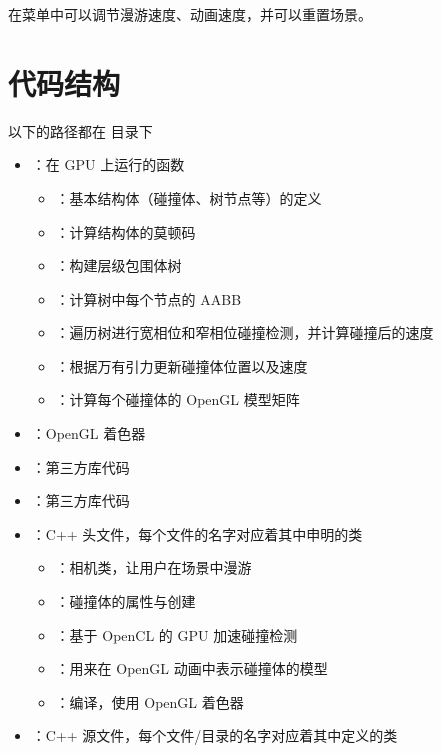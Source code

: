 在菜单中可以调节漫游速度、动画速度，并可以重置场景。


\section{代码结构}

以下的路径都在  目录下

\begin{itemize}
    \item {}：在 GPU 上运行的函数
    \begin{itemize}
        \item {}：基本结构体（碰撞体、树节点等）的定义
        \item {}：计算结构体的莫顿码
        \item {}：构建层级包围体树
        \item {}：计算树中每个节点的 AABB
        \item {}：遍历树进行宽相位和窄相位碰撞检测，并计算碰撞后的速度
        \item {}：根据万有引力更新碰撞体位置以及速度
        \item {}：计算每个碰撞体的 OpenGL 模型矩阵
    \end{itemize}
    \item {}：OpenGL 着色器
    \item {}：第三方库代码
    \item {}：第三方库代码
    \item {}：C++ 头文件，每个文件的名字对应着其中申明的类
    \begin{itemize}
        \item {}：相机类，让用户在场景中漫游
        \item {}：碰撞体的属性与创建
        \item {}：基于 OpenCL 的 GPU 加速碰撞检测
        \item {}：用来在 OpenGL 动画中表示碰撞体的模型
        \item {}：编译，使用 OpenGL 着色器
    \end{itemize}
    \item {}：C++ 源文件，每个文件/目录的名字对应着其中定义的类
\end{itemize}

